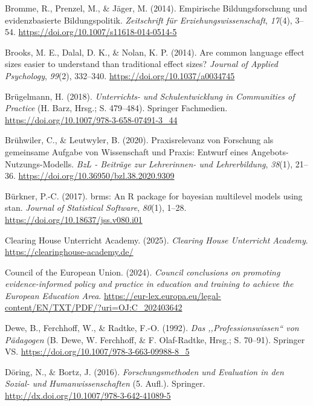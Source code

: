 \documentclass[
  man,
  floatsintext,
  longtable,
  nolmodern,
  notxfonts,
  notimes,
  colorlinks=true,linkcolor=blue,citecolor=blue,urlcolor=blue]{apa7}
\newlength{\cslhangindent}
\newenvironment{CSLReferences}[2] %
 {\begin{list}{}{%
  \setlength{\itemindent}{0pt}
  \setlength{\leftmargin}{0pt}
  \setlength{\parsep}{0pt}
  \ifodd #1
   \setlength{\leftmargin}{\cslhangindent}
   \setlength{\itemindent}{-1\cslhangindent}
  \fi
  \setlength{\itemsep}{#2\baselineskip}}}
 {\end{list}}
\begin{document}
\begin{CSLReferences}{1}{0}
Bromme, R., Prenzel, M., \& Jäger, M. (2014). Empirische
Bildungsforschung und evidenzbasierte Bildungspolitik. \emph{Zeitschrift
für Erziehungswissenschaft}, \emph{17}(4), 3--54.
\url{https://doi.org/10.1007/s11618-014-0514-5}

Brooks, M. E., Dalal, D. K., \& Nolan, K. P. (2014). Are common language
effect sizes easier to understand than traditional effect sizes?
\emph{Journal of Applied Psychology}, \emph{99}(2), 332--340.
\url{https://doi.org/10.1037/a0034745}

Brügelmann, H. (2018). \emph{Unterrichts- und Schulentwicklung in
Communities of Practice} (H. Barz, Hrsg.; S. 479--484). Springer
Fachmedien. \url{https://doi.org/10.1007/978-3-658-07491-3_44}

Brühwiler, C., \& Leutwyler, B. (2020). Praxisrelevanz von Forschung als
gemeinsame Aufgabe von Wissenschaft und Praxis: Entwurf eines
Angebots-Nutzungs-Modells. \emph{BzL - Beiträge zur Lehrerinnen- und
Lehrerbildung}, \emph{38}(1), 21--36.
\url{https://doi.org/10.36950/bzl.38.2020.9309}

Bürkner, P.-C. (2017). brms: An R package for bayesian multilevel models
using stan. \emph{Journal of Statistical Software}, \emph{80}(1), 1--28.
\url{https://doi.org/10.18637/jss.v080.i01}

Clearing House Unterricht Academy. (2025). \emph{Clearing House
Unterricht Academy}. \url{https://clearinghouse-academy.de/}

Council of the European Union. (2024). \emph{Council conclusions on
promoting evidence-informed policy and practice in education and
training to achieve the European Education Area}.
\url{https://eur-lex.europa.eu/legal-content/EN/TXT/PDF/?uri=OJ:C_202403642}

Dewe, B., Ferchhoff, W., \& Radtke, F.-O. (1992). \emph{Das
{,,}Professionswissen{``} von Pädagogen} (B. Dewe, W. Ferchhoff, \& F.
Olaf-Radtke, Hrsg.; S. 70--91). Springer VS.
\url{https://doi.org/10.1007/978-3-663-09988-8_5}

Döring, N., \& Bortz, J. (2016). \emph{Forschungsmethoden und Evaluation
in den Sozial- und Humanwissenschaften} (5. Aufl.). Springer.
\url{http://dx.doi.org/10.1007/978-3-642-41089-5}


\end{CSLReferences}
\end{document}
